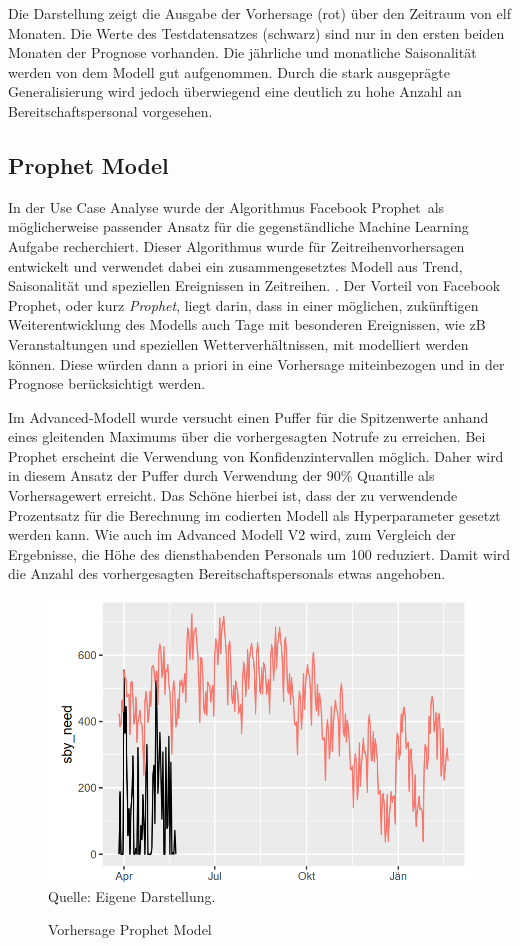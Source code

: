 Die Darstellung zeigt die Ausgabe der Vorhersage (rot) über den Zeitraum von elf Monaten. Die Werte des Testdatensatzes (schwarz) sind nur in den ersten beiden Monaten der Prognose vorhanden. Die jährliche und monatliche Saisonalität werden von dem Modell gut aufgenommen. Durch die stark ausgeprägte Generalisierung wird jedoch überwiegend eine deutlich zu hohe Anzahl an Bereitschaftspersonal vorgesehen.


 \subsection{Prophet Model} 

In der Use Case Analyse wurde der Algorithmus \glqq Facebook Prophet\grqq\ als möglicherweise passender Ansatz für die gegenständliche Machine Learning Aufgabe recherchiert. Dieser Algorithmus wurde für Zeitreihenvorhersagen entwickelt und verwendet dabei ein zusammengesetztes Modell aus Trend, Saisonalität und speziellen Ereignissen in Zeitreihen. \citep{taylor_forecasting_2017}. Der Vorteil von Facebook Prophet, oder kurz \textit{Prophet}, liegt darin, dass in einer möglichen, zukünftigen Weiterentwicklung des Modells auch Tage mit besonderen Ereignissen, wie zB Veranstaltungen und speziellen Wetterverhältnissen, mit modelliert werden können. Diese würden dann a priori in eine Vorhersage miteinbezogen und in der Prognose berücksichtigt werden.

Im Advanced-Modell wurde versucht einen Puffer für die Spitzenwerte anhand eines gleitenden Maximums über die vorhergesagten Notrufe zu erreichen. Bei Prophet erscheint die Verwendung von Konfidenzintervallen möglich. Daher wird in diesem Ansatz der Puffer durch Verwendung der 90\% Quantille als Vorhersagewert erreicht. Das Schöne hierbei ist, dass der zu verwendende Prozentsatz für die Berechnung im codierten Modell als Hyperparameter gesetzt werden kann. Wie auch im Advanced Modell V2 wird, zum Vergleich der Ergebnisse, die Höhe des diensthabenden Personals um 100 reduziert. Damit wird die Anzahl des vorhergesagten Bereitschaftspersonals etwas angehoben. 
 
\begin{figure}[h]
\centering
\caption{Vorhersage Prophet Model}
\includegraphics[width=15cm]{01_resources/prophet.png}\\
Quelle: Eigene Darstellung.
\label{fig:prophet}
\end{figure}
\FloatBarrier 

